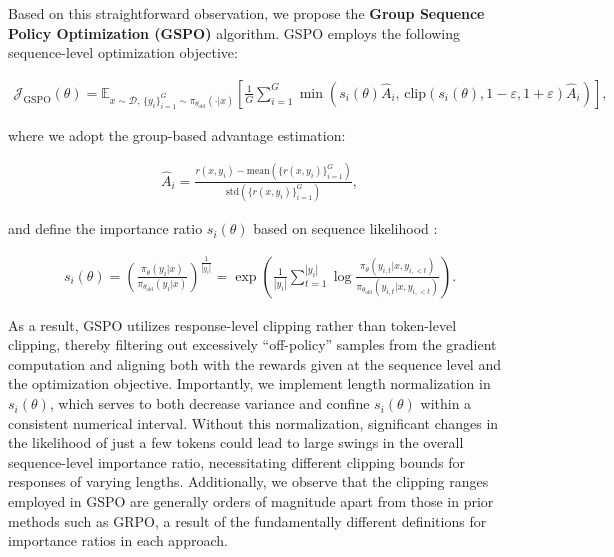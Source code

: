 Based on this straightforward observation, we propose the \textbf{Group Sequence Policy Optimization (GSPO)} algorithm. GSPO employs the following sequence-level optimization objective:

\begin{align}
\mathcal{J}_\text{GSPO} (\theta) =
\mathbb{E}_{ x \sim \mathcal{D},\, \{y_i\}_{i=1}^G \sim \pi_{\theta_\text{old}}( \cdot | x) }
\left[ 
\frac{1}{G} \sum_{i=1}^{G}
\min \left( s_{i}(\theta)  \widehat{A}_{i},  \, \mathrm{clip} \left( s_{i}(\theta), 1 - {\varepsilon}, 1 + {\varepsilon} \right) \widehat{A}_{i} \right) 
\right],
\label{equ:gspo}
\end{align}

where we adopt the group-based advantage estimation:

\begin{align}
\widehat{A}_{i} = \frac{r(x, y_i) - \mathrm{mean} \left( \{ r(x, y_i) \}_{i=1}^G \right) }{ \mathrm{std} \left( \{ r(x, y_i) \}_{i=1}^G \right) },
\end{align}

and define the importance ratio $s_{i}(\theta)$ based on sequence likelihood \citep{click}:

\begin{align}
s_{i}(\theta) = \left( \frac{ \pi_{\theta} (y_i | x) }{ \pi_{\theta_\text{old}} (y_i | x)} \right)^{\frac{1}{|y_i|}}
=
\exp \left( \frac{1}{|y_i|} \sum_{t=1}^{|y_i|} \log \frac{ \pi_{\theta} (y_{i,t} | x, y_{i,<t}) }{ \pi_{\theta_\text{old}} (y_{i,t} | x,y_{i,<t})} \right).
\end{align}

As a result, GSPO utilizes response-level clipping rather than token-level clipping, thereby filtering out excessively ``off-policy'' samples from the gradient computation and aligning both with the rewards given at the sequence level and the optimization objective. Importantly, we implement length normalization in $s_{i}(\theta)$, which serves to both decrease variance and confine $s_{i}(\theta)$ within a consistent numerical interval. Without this normalization, significant changes in the likelihood of just a few tokens could lead to large swings in the overall sequence-level importance ratio, necessitating different clipping bounds for responses of varying lengths. Additionally, we observe that the clipping ranges employed in GSPO are generally orders of magnitude apart from those in prior methods such as GRPO, a result of the fundamentally different definitions for importance ratios in each approach.


